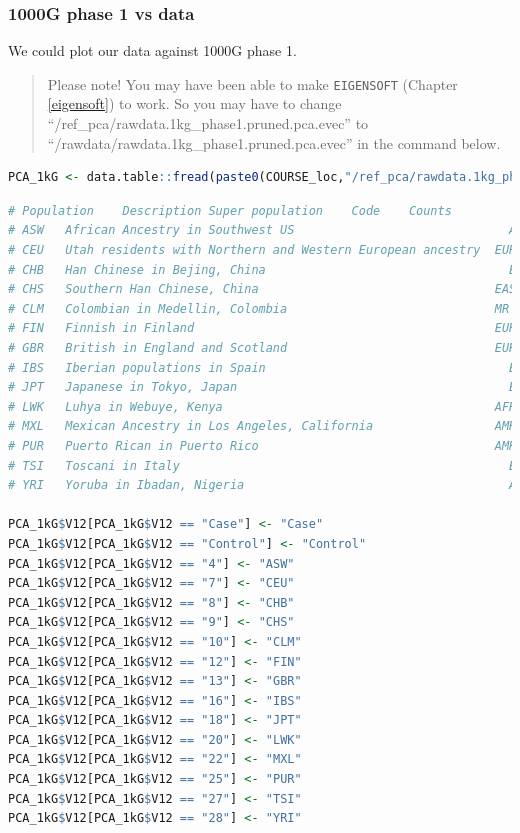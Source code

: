 \documentclass[
]{book}
\newcommand{\passthrough}[1]{#1}
\begin{document}
\hypertarget{g-phase-1-vs-data-1}{%
\subsubsection{1000G phase 1 vs data}\label{g-phase-1-vs-data-1}}

We could plot our data against 1000G phase 1.

\begin{quote}
Please note! You may have been able to make \passthrough{\lstinline!EIGENSOFT!} (Chapter \ref{eigensoft}) to work. So you may have to change ``/ref\_pca/rawdata.1kg\_phase1.pruned.pca.evec'' to ``/rawdata/rawdata.1kg\_phase1.pruned.pca.evec'' in the command below.
\end{quote}

\begin{lstlisting}[language=R]
PCA_1kG <- data.table::fread(paste0(COURSE_loc,"/ref_pca/rawdata.1kg_phase1.pruned.pca.evec"), header = FALSE, skip = 1)
\end{lstlisting}

\begin{lstlisting}[language=R]
# Population    Description Super population    Code    Counts
# ASW   African Ancestry in Southwest US                              AFR   4     #49A01D
# CEU   Utah residents with Northern and Western European ancestry  EUR 7     #E55738
# CHB   Han Chinese in Bejing, China                                  EAS   8     #9A3480
# CHS   Southern Han Chinese, China                                 EAS 9     #705296
# CLM   Colombian in Medellin, Colombia                             MR  10  #8D5B9A
# FIN   Finnish in Finland                                          EUR 12  #2F8BC9
# GBR   British in England and Scotland                             EUR 13  #1290D9
# IBS   Iberian populations in Spain                                  EUR   16  #1396D8
# JPT   Japanese in Tokyo, Japan                                      EAS   18  #D5267B
# LWK   Luhya in Webuye, Kenya                                      AFR 20  #78B113
# MXL   Mexican Ancestry in Los Angeles, California                 AMR 22  #F59D10
# PUR   Puerto Rican in Puerto Rico                                 AMR 25  #FBB820
# TSI   Toscani in Italy                                              EUR   27  #4C81BF
# YRI   Yoruba in Ibadan, Nigeria                                     AFR   28  #C5D220

PCA_1kG$V12[PCA_1kG$V12 == "Case"] <- "Case"
PCA_1kG$V12[PCA_1kG$V12 == "Control"] <- "Control"
PCA_1kG$V12[PCA_1kG$V12 == "4"] <- "ASW"
PCA_1kG$V12[PCA_1kG$V12 == "7"] <- "CEU"
PCA_1kG$V12[PCA_1kG$V12 == "8"] <- "CHB"
PCA_1kG$V12[PCA_1kG$V12 == "9"] <- "CHS"
PCA_1kG$V12[PCA_1kG$V12 == "10"] <- "CLM"
PCA_1kG$V12[PCA_1kG$V12 == "12"] <- "FIN"
PCA_1kG$V12[PCA_1kG$V12 == "13"] <- "GBR"
PCA_1kG$V12[PCA_1kG$V12 == "16"] <- "IBS"
PCA_1kG$V12[PCA_1kG$V12 == "18"] <- "JPT"
PCA_1kG$V12[PCA_1kG$V12 == "20"] <- "LWK"
PCA_1kG$V12[PCA_1kG$V12 == "22"] <- "MXL"
PCA_1kG$V12[PCA_1kG$V12 == "25"] <- "PUR"
PCA_1kG$V12[PCA_1kG$V12 == "27"] <- "TSI"
PCA_1kG$V12[PCA_1kG$V12 == "28"] <- "YRI"
\end{lstlisting}
\end{document}

